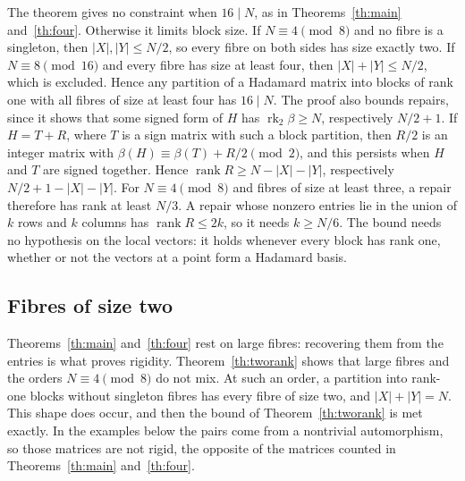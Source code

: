 \documentclass[11pt,reqno]{amsart}
\theoremstyle{remark}\newtheorem{remark}[theorem]{Remark}
\newcommand{\rank}{\operatorname{rank}}
\begin{document}
The theorem gives no constraint when \(16\mid N\), as in Theorems~\ref{th:main} and~\ref{th:four}. Otherwise it limits block size. If \(N\equiv4\pmod 8\) and no fibre is a singleton, then \(|X|,|Y|\le N/2\), so every fibre on both sides has size exactly two. If \(N\equiv8\pmod{16}\) and every fibre has size at least four, then \(|X|+|Y|\le N/2\), which is excluded. Hence any partition of a Hadamard matrix into blocks of rank one with all fibres of size at least four has \(16\mid N\). The proof also bounds repairs, since it shows that some signed form of \(H\) has \(\operatorname{rk}_2\beta\ge N\), respectively \(N/2+1\). If \(H=T+R\), where \(T\) is a sign matrix with such a block partition, then \(R/2\) is an integer matrix with \(\beta(H)\equiv\beta(T)+R/2\pmod 2\), and this persists when \(H\) and \(T\) are signed together. Hence \(\rank R\ge N-|X|-|Y|\), respectively \(N/2+1-|X|-|Y|\). For \(N\equiv4\pmod 8\) and fibres of size at least three, a repair therefore has rank at least \(N/3\). A repair whose nonzero entries lie in the union of \(k\) rows and \(k\) columns has \(\rank R\le2k\), so it needs \(k\ge N/6\). The bound needs no hypothesis on the local vectors: it holds whenever every block has rank one, whether or not the vectors at a point form a Hadamard basis.

\subsection{Fibres of size two}\label{sec:sizetwo}
Theorems~\ref{th:main} and~\ref{th:four} rest on large fibres: recovering them from the entries is what proves rigidity. Theorem~\ref{th:tworank} shows that large fibres and the orders \(N\equiv4\pmod 8\) do not mix. At such an order, a partition into rank-one blocks without singleton fibres has every fibre of size two, and \(|X|+|Y|=N\). This shape does occur, and then the bound of Theorem~\ref{th:tworank} is met exactly. In the examples below the pairs come from a nontrivial automorphism, so those matrices are not rigid, the opposite of the matrices counted in Theorems~\ref{th:main} and~\ref{th:four}.
\end{document}
